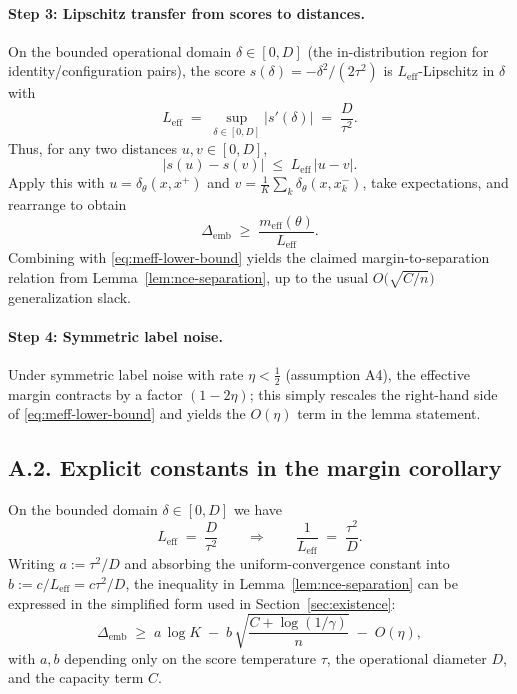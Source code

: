\documentclass[11pt]{article}
\theoremstyle{remark}
\theoremstyle{plain}
\begin{document}
\paragraph{Step 3: Lipschitz transfer from scores to distances.}
On the bounded operational domain $\delta \in [0,D]$ (the in-distribution region for
identity/configuration pairs), the score $s(\delta) = -\delta^2/(2\tau^2)$ is
$L_{\mathrm{eff}}$-Lipschitz in $\delta$ with
\[
L_{\mathrm{eff}}
\;=\;
\sup_{\delta\in[0,D]} |s'(\delta)|
\;=\;
\frac{D}{\tau^2}.
\]
Thus, for any two distances $u,v\in[0,D]$,
\[
|s(u) - s(v)| \;\le\; L_{\mathrm{eff}}\,|u-v|.
\]
Apply this with $u=\delta_\theta(x,x^{+})$ and $v=\frac{1}{K}\sum_k \delta_\theta(x,x_k^{-})$,
take expectations, and rearrange to obtain
\[
\Delta_{\mathrm{emb}}
\;\ge\;
\frac{m_{\mathrm{eff}}(\theta)}{L_{\mathrm{eff}}}.
\]
Combining with \eqref{eq:meff-lower-bound} yields the claimed margin-to-separation relation
from Lemma~\ref{lem:nce-separation}, up to the usual $O\!\big(\sqrt{C/n}\big)$ generalization
slack.

\paragraph{Step 4: Symmetric label noise.}
Under symmetric label noise with rate $\eta<\tfrac12$ (assumption A4), the effective margin
contracts by a factor $(1-2\eta)$; this simply rescales the right-hand side of
\eqref{eq:meff-lower-bound} and yields the $O(\eta)$ term in the lemma statement.  \qedhere

\medskip

\subsection*{A.2. Explicit constants in the margin corollary}

On the bounded domain $\delta\in[0,D]$ we have
\[
L_{\mathrm{eff}} \;=\; \frac{D}{\tau^2}
\qquad\Longrightarrow\qquad
\frac{1}{L_{\mathrm{eff}}} \;=\; \frac{\tau^2}{D}.
\]
Writing $a := \tau^2/D$ and absorbing the uniform-convergence constant into $b := c/L_{\mathrm{eff}}
= c\tau^2/D$, the inequality in Lemma~\ref{lem:nce-separation} can be expressed in the simplified
form used in Section~\ref{sec:existence}:
\[
\Delta_{\mathrm{emb}}
\;\ge\;
a\,\log K
\;-\;
b\,\sqrt{\frac{C + \log(1/\gamma)}{n}}
\;-\;
O(\eta),
\]
with $a,b$ depending only on the score temperature $\tau$, the operational diameter $D$, and
the capacity term $C$.

\medskip
\end{document}
